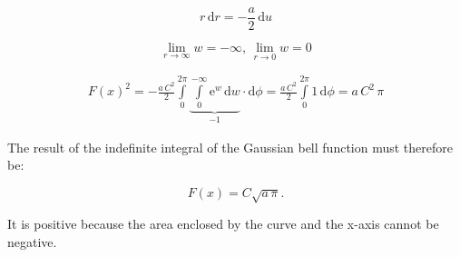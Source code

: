 \begin{center}
	\begin{equation} \label{eq:diff_r}
		r\,\mathrm{d}r = -\frac{a}{2} \, \mathrm{d}u
	\end{equation}
\end{center}
\begin{center}
	\begin{equation} \label{eq:lim_r}
		\lim\limits_{r \to \infty} w = -\infty \text{, } \lim\limits_{r \to 0} w = 0
	\end{equation}
\end{center}
\begin{center}
	\begin{equation} \label{eq:integral_gauss_solved}
		\begin{split}
		F\left(x\right)^2 = -\frac{a \, C^2}{2}\int\limits_{0}^{2\pi} \underbrace{\int\limits_{0}^{-\infty} \mathrm{e}^w \,\mathrm{d}w}_{-1} \cdot \mathrm{d}\phi = \frac{a \, C^2}{2}\int\limits_{0}^{2\pi} 1 \, \mathrm{d}\phi = a \, C^2 \, \pi
		\end{split}
	\end{equation}
\end{center}
The result of the indefinite integral of the Gaussian bell function must therefore be:
\begin{center}
	\begin{equation} \label{eq:result}
		F(x) = C \sqrt{a \, \pi} \text{.}
	\end{equation}
\end{center}
It is positive because the area enclosed by the curve and the x-axis cannot be negative. 
